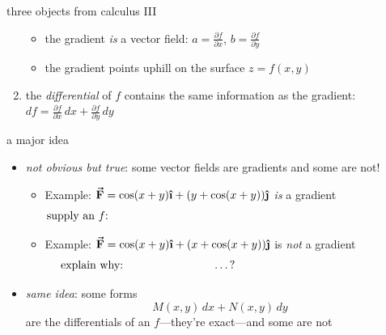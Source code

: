 \documentclass{beamer}
\newcommand{\ih}{\boldsymbol{\hat{\textbf{\i}}}}
\newcommand{\jh}{\boldsymbol{\hat{\textbf{\j}}}}
\newcommand{\vF}{\boldsymbol{\vec{\textbf{F}}}}
\begin{document}
\begin{frame}{three objects from calculus III}
\begin{enumerate}
    \vspace{-2mm}
    \begin{itemize}
    \item the gradient \emph{is} a vector field:  $a=\frac{\partial f}{\partial x}$, $b=\frac{\partial f}{\partial y}$
    \item the gradient points uphill on the surface $z=f(x,y)$
    \end{itemize}
\item the \emph{differential} of $f$ contains the same information as the gradient: $df = \frac{\partial f}{\partial x}\,dx + \frac{\partial f}{\partial y}\,dy$
\end{enumerate}
\end{frame}


\begin{frame}{a major idea}

\begin{itemize}
\item \emph{not obvious but true}: some vector fields are gradients and some are not!

\medskip
    \begin{itemize}
    \item Example: $\vF=\cos(x+y)\ih + (y+\cos(x+y))\jh$ \emph{is} a gradient
        $$\text{supply an $f$:} \hspace{4.0in}$$

\medskip
    \item Example: $\vF=\cos(x+y)\ih + (x+\cos(x+y))\jh$ is \emph{not} a gradient
        $$\text{explain why: \hspace{1.0in} \dots ?} \hspace{2.0in}$$
    \end{itemize}
\item \emph{same idea}: some forms
    $$M(x,y)\,dx + N(x,y)\,dy$$
are the differentials of an $f$---they're \alert{exact}---and some are not
\end{itemize}
\end{frame}
\end{document}

